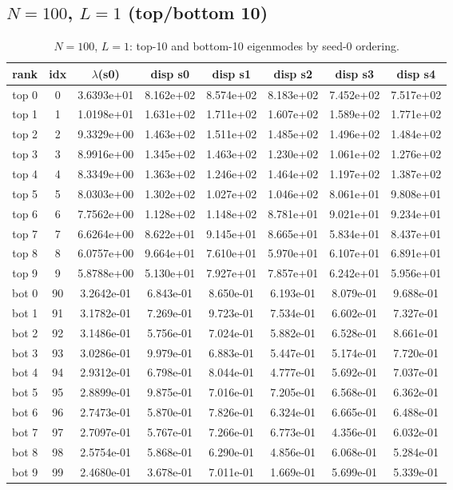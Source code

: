 \subsection{$N=100$, $L=1$ (top/bottom 10)}
\begin{table}[H]
\centering
\caption{$N=100$, $L=1$: top-10 and bottom-10 eigenmodes by seed-0 ordering.}
\label{tab:permode-N100-L1}
\begin{tabular}{c c c c c c c c}
\toprule
rank & idx & $\lambda$(s0) & disp s0 & disp s1 & disp s2 & disp s3 & disp s4 \\
\midrule
top 0 & 0 & 3.6393e+01 & 8.162e+02 & 8.574e+02 & 8.183e+02 & 7.452e+02 & 7.517e+02 \\
top 1 & 1 & 1.0198e+01 & 1.631e+02 & 1.711e+02 & 1.607e+02 & 1.589e+02 & 1.771e+02 \\
top 2 & 2 & 9.3329e+00 & 1.463e+02 & 1.511e+02 & 1.485e+02 & 1.496e+02 & 1.484e+02 \\
top 3 & 3 & 8.9916e+00 & 1.345e+02 & 1.463e+02 & 1.230e+02 & 1.061e+02 & 1.276e+02 \\
top 4 & 4 & 8.3349e+00 & 1.363e+02 & 1.246e+02 & 1.464e+02 & 1.197e+02 & 1.387e+02 \\
top 5 & 5 & 8.0303e+00 & 1.302e+02 & 1.027e+02 & 1.046e+02 & 8.061e+01 & 9.808e+01 \\
top 6 & 6 & 7.7562e+00 & 1.128e+02 & 1.148e+02 & 8.781e+01 & 9.021e+01 & 9.234e+01 \\
top 7 & 7 & 6.6264e+00 & 8.622e+01 & 9.145e+01 & 8.665e+01 & 5.834e+01 & 8.437e+01 \\
top 8 & 8 & 6.0757e+00 & 9.664e+01 & 7.610e+01 & 5.970e+01 & 6.107e+01 & 6.891e+01 \\
top 9 & 9 & 5.8788e+00 & 5.130e+01 & 7.927e+01 & 7.857e+01 & 6.242e+01 & 5.956e+01 \\
\midrule
bot 0 & 90 & 3.2642e-01 & 6.843e-01 & 8.650e-01 & 6.193e-01 & 8.079e-01 & 9.688e-01 \\
bot 1 & 91 & 3.1782e-01 & 7.269e-01 & 9.723e-01 & 7.534e-01 & 6.602e-01 & 7.327e-01 \\
bot 2 & 92 & 3.1486e-01 & 5.756e-01 & 7.024e-01 & 5.882e-01 & 6.528e-01 & 8.661e-01 \\
bot 3 & 93 & 3.0286e-01 & 9.979e-01 & 6.883e-01 & 5.447e-01 & 5.174e-01 & 7.720e-01 \\
bot 4 & 94 & 2.9312e-01 & 6.798e-01 & 8.044e-01 & 4.777e-01 & 5.692e-01 & 7.037e-01 \\
bot 5 & 95 & 2.8899e-01 & 9.875e-01 & 7.016e-01 & 7.205e-01 & 6.568e-01 & 6.362e-01 \\
bot 6 & 96 & 2.7473e-01 & 5.870e-01 & 7.826e-01 & 6.324e-01 & 6.665e-01 & 6.488e-01 \\
bot 7 & 97 & 2.7097e-01 & 5.767e-01 & 7.266e-01 & 6.773e-01 & 4.356e-01 & 6.032e-01 \\
bot 8 & 98 & 2.5754e-01 & 5.868e-01 & 6.290e-01 & 4.856e-01 & 6.068e-01 & 5.284e-01 \\
bot 9 & 99 & 2.4680e-01 & 3.678e-01 & 7.011e-01 & 1.669e-01 & 5.699e-01 & 5.339e-01 \\
\bottomrule
\end{tabular}
\end{table}


